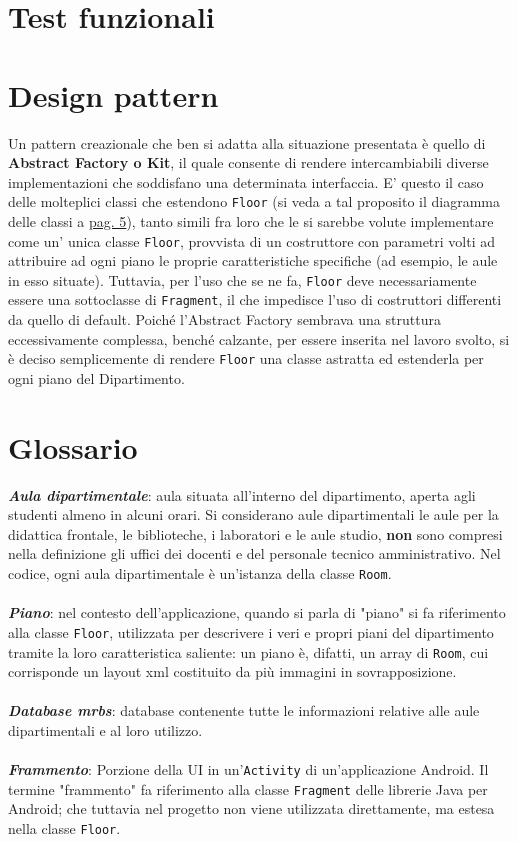 \documentclass{article}
\def\code#1{\texttt{#1}}
\begin{document}
	\part{Test funzionali}
	\newpage
	\part{Design pattern} %
	Un pattern creazionale che ben si adatta alla situazione presentata è quello di \textbf{Abstract Factory o Kit}, il quale consente di rendere intercambiabili diverse implementazioni che soddisfano una determinata interfaccia. E' questo il caso delle molteplici classi che estendono \code{Floor} (si veda a tal proposito il diagramma delle classi a \hyperlink{page.5}{pag. 5}), tanto simili fra loro che le si sarebbe volute implementare come un' unica classe \code{Floor}, provvista di un costruttore con parametri volti ad attribuire ad ogni piano le proprie caratteristiche specifiche (ad esempio, le aule in esso situate). Tuttavia, per l'uso che se ne fa, \code{Floor} deve necessariamente essere una sottoclasse di \code{Fragment}, il che impedisce l'uso di costruttori differenti da quello di default. Poiché l'Abstract Factory sembrava una struttura eccessivamente complessa, benché calzante, per essere inserita nel lavoro svolto, si è deciso semplicemente di rendere \code{Floor} una classe astratta ed estenderla per ogni piano del Dipartimento.
	\newpage
	\appendix
	\part{Glossario}
	\textit{\textbf{Aula dipartimentale}}: aula situata all'interno del dipartimento, aperta agli studenti almeno in alcuni orari. Si considerano aule dipartimentali le aule per la didattica frontale, le biblioteche, i laboratori e le aule studio, \textbf{non} sono compresi nella definizione gli uffici dei docenti e del personale tecnico amministrativo. Nel codice, ogni aula dipartimentale è un'istanza della classe \code{Room}.\\\\
	\textit{\textbf{Piano}}: nel contesto dell'applicazione, quando si parla di "piano" si fa riferimento alla classe \code{Floor}, utilizzata per descrivere i veri e propri piani del dipartimento tramite la loro caratteristica saliente: un piano è, difatti, un array di \code{Room}, cui corrisponde un layout xml costituito da più immagini in sovrapposizione.\\\\
	\textit{\textbf{Database mrbs}}: database contenente tutte le informazioni relative alle aule dipartimentali e al loro utilizzo.\\\\
	\textit{\textbf{Frammento}}: Porzione della UI in un'\code{Activity} di un'applicazione Android. Il termine "frammento" fa riferimento alla classe \code{Fragment} delle librerie Java per Android; che tuttavia nel progetto non viene utilizzata direttamente, ma estesa nella classe \code{Floor}.\\\\
\end{document}
